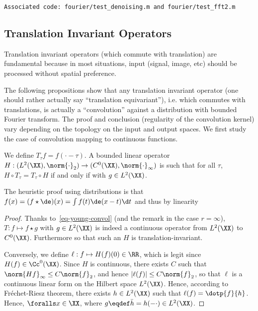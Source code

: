 \texttt{Associated code: fourier/test\_denoising.m and fourier/test\_fft2.m}

\subsection{Translation Invariant Operators}

Translation invariant operators (which commute with translation) are fundamental because in most situations, input (signal, image, etc) should be processed without spatial preference.

The following propositions show that any translation invariant operator (one should rather actually say ``translation equivariant''), i.e. which commutes with translations,   is actually a ``convolution'' against a distribution with bounded Fourier transform. 
%
The proof and conclusion (regularity of the convolution kernel) vary depending on the topology on the input and output spaces.
%
We first study the case of convolution mapping to continuous functions.

\begin{prop}
	We define $T_\tau f = f(\cdot-\tau)$.
 	A bounded linear operator $H : (L^2(\XX),\norm{\cdot}_2) \rightarrow (C^0(\XX),\norm{\cdot}_\infty)$ is such that for all $\tau$, $H \circ T_\tau = T_\tau \circ H$ if and only if 
	with $g \in L^2(\XX)$.
\end{prop}

The heuristic proof using distributions is that $f(x) = (f\star \de)(x) = \int f(t) \de(x-t) \d t$ and thus by linearity


\begin{proof}
	Thanks to~\eqref{eq-young-convol} (and the remark in the case $r=\infty$), $T : f \mapsto f \star g$ with $g \in L^2(\XX)$ is indeed a continuous operator from $L^2(\XX)$ to $C^0(\XX)$.  Furthermore
	so that such an $H$ is translation-invariant. 
	
	
	Conversely, we define $\ell : f \mapsto H(f)(0) \in \RR$, which is legit since $H(f) \in \Cc^0(\XX)$. 
	Since $H$ is continuous, there exists $C$ such that $\norm{Hf}_\infty \leq C \norm{f}_2$, and hence $|\ell(f)| \leq C \norm{f}_2$, so that $\ell$ is a continuous linear form on the Hilbert space $L^2(\XX)$. Hence, according to Fr\'echet-Riesz theorem, there exists $h \in L^2(\XX)$ such that $\ell(f)=\dotp{f}{h}$.
	Hence, $\foralls x \in \XX$, 
	where $g \eqdef \bar h=h(-\cdot) \in L^2(\XX)$.
\end{proof}

